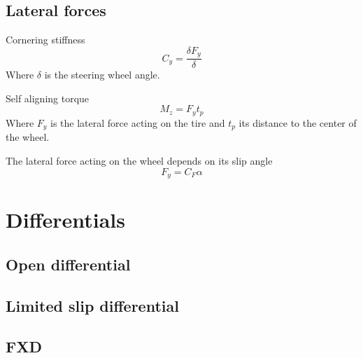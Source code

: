 \subsection{Lateral forces}

Cornering stiffness
\begin{equation}
	C_{y} = \frac{\delta F_{y}}{\delta}
\end{equation}
Where $\delta$ is the steering wheel angle.

Self aligning torque
\begin{equation}
	M_{z} = F_{y}t_{p}
\end{equation}
Where $ F_{y} $  is the lateral force acting on the tire and $ t_{p} $ its distance to the center of the wheel. 

The lateral force acting on the wheel depends on its slip angle
\begin{equation}
	F_{y}=C_{F}\alpha
\end{equation}

\section{Differentials}

\subsection{Open differential}

\subsection{Limited slip differential}

\subsection{FXD}